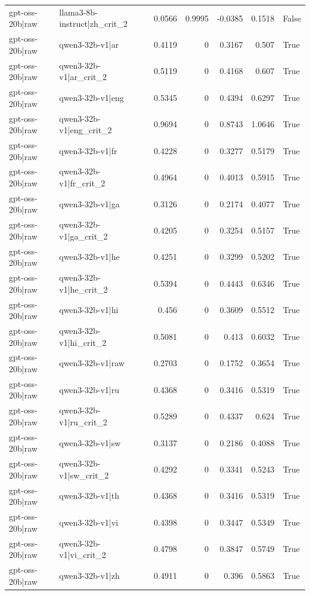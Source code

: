 \begin{table}
\begin{tabular}{l l r r r r l}
gpt-oss-20b|raw & llama3-8b-instruct|zh_crit_2 & 0.0566 & 0.9995 & -0.0385 & 0.1518 & False \\
gpt-oss-20b|raw & qwen3-32b-v1|ar & 0.4119 & 0 & 0.3167 & 0.507 & True \\
gpt-oss-20b|raw & qwen3-32b-v1|ar_crit_2 & 0.5119 & 0 & 0.4168 & 0.607 & True \\
gpt-oss-20b|raw & qwen3-32b-v1|eng & 0.5345 & 0 & 0.4394 & 0.6297 & True \\
gpt-oss-20b|raw & qwen3-32b-v1|eng_crit_2 & 0.9694 & 0 & 0.8743 & 1.0646 & True \\
gpt-oss-20b|raw & qwen3-32b-v1|fr & 0.4228 & 0 & 0.3277 & 0.5179 & True \\
gpt-oss-20b|raw & qwen3-32b-v1|fr_crit_2 & 0.4964 & 0 & 0.4013 & 0.5915 & True \\
gpt-oss-20b|raw & qwen3-32b-v1|ga & 0.3126 & 0 & 0.2174 & 0.4077 & True \\
gpt-oss-20b|raw & qwen3-32b-v1|ga_crit_2 & 0.4205 & 0 & 0.3254 & 0.5157 & True \\
gpt-oss-20b|raw & qwen3-32b-v1|he & 0.4251 & 0 & 0.3299 & 0.5202 & True \\
gpt-oss-20b|raw & qwen3-32b-v1|he_crit_2 & 0.5394 & 0 & 0.4443 & 0.6346 & True \\
gpt-oss-20b|raw & qwen3-32b-v1|hi & 0.456 & 0 & 0.3609 & 0.5512 & True \\
gpt-oss-20b|raw & qwen3-32b-v1|hi_crit_2 & 0.5081 & 0 & 0.413 & 0.6032 & True \\
gpt-oss-20b|raw & qwen3-32b-v1|raw & 0.2703 & 0 & 0.1752 & 0.3654 & True \\
gpt-oss-20b|raw & qwen3-32b-v1|ru & 0.4368 & 0 & 0.3416 & 0.5319 & True \\
gpt-oss-20b|raw & qwen3-32b-v1|ru_crit_2 & 0.5289 & 0 & 0.4337 & 0.624 & True \\
gpt-oss-20b|raw & qwen3-32b-v1|sw & 0.3137 & 0 & 0.2186 & 0.4088 & True \\
gpt-oss-20b|raw & qwen3-32b-v1|sw_crit_2 & 0.4292 & 0 & 0.3341 & 0.5243 & True \\
gpt-oss-20b|raw & qwen3-32b-v1|th & 0.4368 & 0 & 0.3416 & 0.5319 & True \\
gpt-oss-20b|raw & qwen3-32b-v1|vi & 0.4398 & 0 & 0.3447 & 0.5349 & True \\
gpt-oss-20b|raw & qwen3-32b-v1|vi_crit_2 & 0.4798 & 0 & 0.3847 & 0.5749 & True \\
gpt-oss-20b|raw & qwen3-32b-v1|zh & 0.4911 & 0 & 0.396 & 0.5863 & True \\

\end{tabular}
\end{table}
